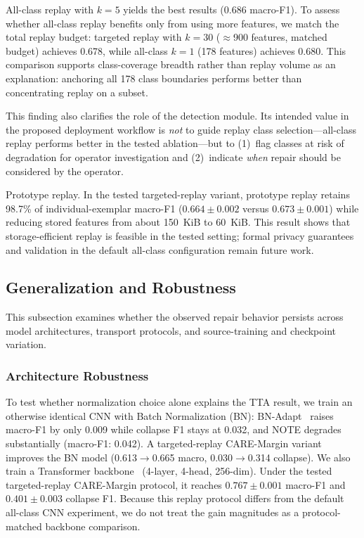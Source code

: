 \documentclass[journal]{IEEEtran}
\newcommand{\ours}{CARE}  %
\begin{document}
All-class replay with $k{=}5$ yields the best results (0.686 macro-F1).
To assess whether all-class replay benefits only from using more features, we match the total replay budget: targeted replay with $k{=}30$ (${\approx}$900 features, matched budget) achieves 0.678, while all-class $k{=}1$ (178 features) achieves 0.680.
This comparison supports class-coverage breadth rather than replay volume as an explanation: anchoring all 178 class boundaries performs better than concentrating replay on a subset.

This finding also clarifies the role of the detection module.
Its intended value in the proposed deployment workflow is \textit{not} to guide replay class selection---all-class replay performs better in the tested ablation---but to (1)~flag classes at risk of degradation for operator investigation and (2)~indicate \textit{when} repair should be considered by the operator.

Prototype replay.
\label{sec:proto_replay}
In the tested targeted-replay variant, prototype replay retains 98.7\% of individual-exemplar macro-F1 ($0.664{\pm}0.002$ versus $0.673{\pm}0.001$) while reducing stored features from about 150~KiB to 60~KiB. This result shows that storage-efficient replay is feasible in the tested setting; formal privacy guarantees and validation in the default all-class configuration remain future work.

\subsection{Generalization and Robustness}
\label{sec:generalization_robustness}

This subsection examines whether the observed repair behavior persists across model architectures, transport protocols, and source-training and checkpoint variation.

\subsubsection{Architecture Robustness}
\label{sec:robustness}

\label{sec:bn_verify}
\label{sec:transformer}
To test whether normalization choice alone explains the TTA result, we train an otherwise identical CNN with Batch Normalization (BN): BN-Adapt~\cite{schneider2020bn} raises macro-F1 by only 0.009 while collapse F1 stays at 0.032, and NOTE degrades substantially (macro-F1: 0.042). A targeted-replay \ours{}-Margin variant improves the BN model (0.613$\to$0.665 macro, 0.030$\to$0.314 collapse).
We also train a Transformer backbone~\cite{vaswani2017attention} (4-layer, 4-head, 256-dim). Under the tested targeted-replay \ours{}-Margin protocol, it reaches $0.767{\pm}0.001$ macro-F1 and $0.401{\pm}0.003$ collapse F1. Because this replay protocol differs from the default all-class CNN experiment, we do not treat the gain magnitudes as a protocol-matched backbone comparison.
\end{document}
